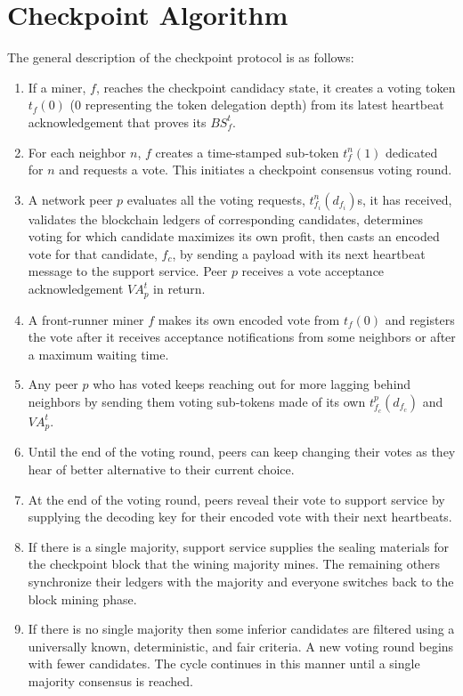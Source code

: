 \section{Checkpoint Algorithm}
\label{s-algorithm}
The general description of the checkpoint protocol is as follows:
\begin{enumerate}
\item If a miner, $f$, reaches the checkpoint candidacy state, it creates a voting token $t_f(0)$ (0 representing the token delegation depth) from its latest heartbeat acknowledgement that proves its  $BS_f^t$.
\item For each neighbor $n$, $f$ creates a time-stamped sub-token $t_f^{n}(1)$ dedicated for $n$ and requests a vote. This initiates a checkpoint consensus voting round.
\item A network peer $p$ evaluates all the voting requests, $t_{f_i}^{n}(d_{f_i})$s, it has received, validates the blockchain ledgers of corresponding candidates, determines voting for which candidate maximizes its own profit, then casts an encoded vote for that candidate, $f_c$, by sending a payload with its next heartbeat message to the support service. Peer $p$ receives a vote acceptance acknowledgement $VA_p^t$ in return.
\item A front-runner miner $f$ makes its own encoded vote from $t_f(0)$ and registers the vote after it receives acceptance notifications from some neighbors or after a maximum waiting time.
\item Any peer $p$ who has voted keeps reaching out for more lagging behind neighbors by sending them voting sub-tokens made of its own $t_{f_c}^{p}(d_{f_c})$ and $VA_p^t$.
\item Until the end of the voting round, peers can keep changing their votes as they hear of better alternative to their current choice.   
\item At the end of the voting round, peers reveal their vote to support service by supplying the decoding key for their encoded vote with their next heartbeats.
\item If there is a single majority, support service supplies the sealing materials for the checkpoint block that the wining majority mines. The remaining others synchronize their ledgers with the majority and everyone switches back to the block mining phase.
\item If there is no single majority then some inferior candidates are filtered using a universally known, deterministic, and fair criteria. A new voting round begins with fewer candidates. The cycle continues in this manner until a single majority consensus is reached.                              
\end{enumerate}

